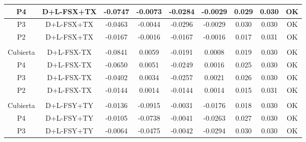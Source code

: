 \begin{table}[H]
{\begin{tabular}{|c|c|c|c|c|c|c|c|c|}
    \hline
    P4  & D+L-FSX+TX & -0.0747 & -0.0073 & -0.0284 & -0.0029 & 0.029 & 0.030 & \cellcolor[rgb]{ .776,  .937,  .808}\textcolor[rgb]{ 0,  .38,  0}{OK} \bigstrut\\
    \hline
    P3  & D+L-FSX+TX & -0.0463 & -0.0044 & -0.0296 & -0.0029 & 0.030 & 0.030 & \cellcolor[rgb]{ .776,  .937,  .808}\textcolor[rgb]{ 0,  .38,  0}{OK} \bigstrut\\
    \hline
    P2  & D+L-FSX+TX & -0.0167 & -0.0016 & -0.0167 & -0.0016 & 0.017 & 0.031 & \cellcolor[rgb]{ .776,  .937,  .808}\textcolor[rgb]{ 0,  .38,  0}{OK} \bigstrut\\
    \hline
    \multicolumn{1}{|r}{} & \multicolumn{1}{r}{} & \multicolumn{1}{r}{} & \multicolumn{1}{r}{} & \multicolumn{1}{r}{} & \multicolumn{1}{r}{} & \multicolumn{1}{r}{} & \multicolumn{1}{r}{} &  \bigstrut\\
    \hline
    Cubierta & D+L-FSX-TX & -0.0841 & 0.0059 & -0.0191 & 0.0008 & 0.019 & 0.030 & \cellcolor[rgb]{ .776,  .937,  .808}\textcolor[rgb]{ 0,  .38,  0}{OK} \bigstrut\\
    \hline
    P4  & D+L-FSX-TX & -0.0650 & 0.0051 & -0.0249 & 0.0016 & 0.025 & 0.030 & \cellcolor[rgb]{ .776,  .937,  .808}\textcolor[rgb]{ 0,  .38,  0}{OK} \bigstrut\\
    \hline
    P3  & D+L-FSX-TX & -0.0402 & 0.0034 & -0.0257 & 0.0021 & 0.026 & 0.030 & \cellcolor[rgb]{ .776,  .937,  .808}\textcolor[rgb]{ 0,  .38,  0}{OK} \bigstrut\\
    \hline
    P2  & D+L-FSX-TX & -0.0144 & 0.0014 & -0.0144 & 0.0014 & 0.015 & 0.031 & \cellcolor[rgb]{ .776,  .937,  .808}\textcolor[rgb]{ 0,  .38,  0}{OK} \bigstrut\\
    \hline
    \multicolumn{1}{|r}{} & \multicolumn{1}{r}{} & \multicolumn{1}{r}{} & \multicolumn{1}{r}{} & \multicolumn{1}{r}{} & \multicolumn{1}{r}{} & \multicolumn{1}{r}{} & \multicolumn{1}{r}{} &  \bigstrut\\
    \hline
    Cubierta & D+L-FSY+TY & -0.0136 & -0.0915 & -0.0031 & -0.0176 & 0.018 & 0.030 & \cellcolor[rgb]{ .776,  .937,  .808}\textcolor[rgb]{ 0,  .38,  0}{OK} \bigstrut\\
    \hline
    P4  & D+L-FSY+TY & -0.0105 & -0.0738 & -0.0041 & -0.0263 & 0.027 & 0.030 & \cellcolor[rgb]{ .776,  .937,  .808}\textcolor[rgb]{ 0,  .38,  0}{OK} \bigstrut\\
    \hline
    P3  & D+L-FSY+TY & -0.0064 & -0.0475 & -0.0042 & -0.0294 & 0.030 & 0.030 & \cellcolor[rgb]{ .776,  .937,  .808}\textcolor[rgb]{ 0,  .38,  0}{OK} \bigstrut\\

\end{tabular}}
\end{table}
